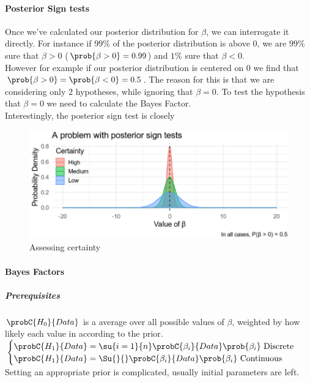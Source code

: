 \paragraph{Posterior Sign tests}
Once we've calculated our posterior distribution for $\beta$, we can interrogate it 
directly. For instance if $99\%$ of the posterior distribution is above 0, we are $99\%$
sure that $\beta>0$ ($\prob{\beta>0}=0.99$) and $1\%$ sure that $\beta<0$.\\
However for example if our posterior distribution is centered on $0$ we find that 
$\prob{\beta>0}=\prob{\beta<0}=0.5$. The reason for this is that we are considering only
2 hypotheses, while ignoring that $\beta=0$. To test the hypothesis that $\beta=0$ we 
need to calculate the Bayes Factor.\\
Interestingly, the posterior sign test is closely 
\begin{figure}[H]
	\begin{center}
		\includegraphics[width=\textwidth]{./chaps/10sec/images/3_sign_test.png}
	\end{center}
	\caption{Assessing certainty}
	\label{fig: 3_sign_test}
\end{figure}

\paragraph{Bayes Factors}
\subparagraph{Prerequisites}
$\probC{H_{0}}{Data}$ is a average over all possible values of $\beta$, weighted by how
likely each value in according to the prior.
$ \begin{cases}
	\probC{H_{1}}{Data} = \su{{i=1}}{n}\probC{\beta_{i}}{Data}\prob{\beta_{i}}\text{
		Discrete}\\
	\probC{H_{1}}{Data} = \Su{}{}\probC{\beta_{i}}{Data}\prob{\beta_{i}}\text{
		Continuous}
\end{cases} $
Setting an appropriate prior is complicated, usually initial parameters are left.

